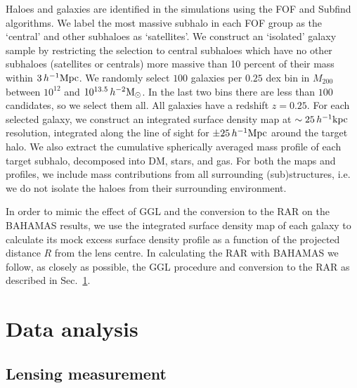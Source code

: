 \documentclass[usenatbib]{mnras}
\newcommand{\hmsun}{\,h^{-2} {\rm M_\odot}}
\newcommand{\hkpc}{\, h^{-1}{\rm{kpc}} }
\newcommand{\hMpc}{\, h^{-1}{\rm{Mpc}} }
\begin{document}
Haloes and galaxies are identified in the simulations using the FOF \citep{davis1985} and Subfind \citep{springel2001,dolag2009} algorithms. We label the most massive subhalo in each FOF group as the `central' and other subhaloes as `satellites'. We construct an `isolated' galaxy sample by restricting the selection to central subhaloes which have no other subhaloes (satellites or centrals) more massive than 10 percent of their mass within $3 \hMpc$. We randomly select $100$ galaxies per $0.25$ dex bin in $M_{200}$ between $10^{12}$ and $10^{13.5} \hmsun$. In the last two bins there are less than $100$ candidates, so we select them all. All galaxies have a redshift $z=0.25$. For each selected galaxy, we construct an integrated surface density map at $\sim 25\hkpc$ resolution, integrated along the line of sight for $\pm 25\hMpc$ around the target halo. We also extract the cumulative spherically averaged mass profile of each target subhalo, decomposed into DM, stars, and gas. For both the maps and profiles, we include mass contributions from all surrounding (sub)structures, i.e. we do not isolate the haloes from their surrounding environment.

In order to mimic the effect of GGL and the conversion to the RAR on the BAHAMAS results, we use the integrated surface density map of each galaxy to calculate its mock excess surface density profile as a function of the projected distance $R$ from the lens centre. In calculating the RAR with BAHAMAS we follow, as closely as possible, the GGL procedure and conversion to the RAR as described in Sec.~\ref{sec:analysis}.

\section{Data analysis}
\label{sec:analysis}

\subsection{Lensing measurement}
\label{sec:lensing}
\end{document}
